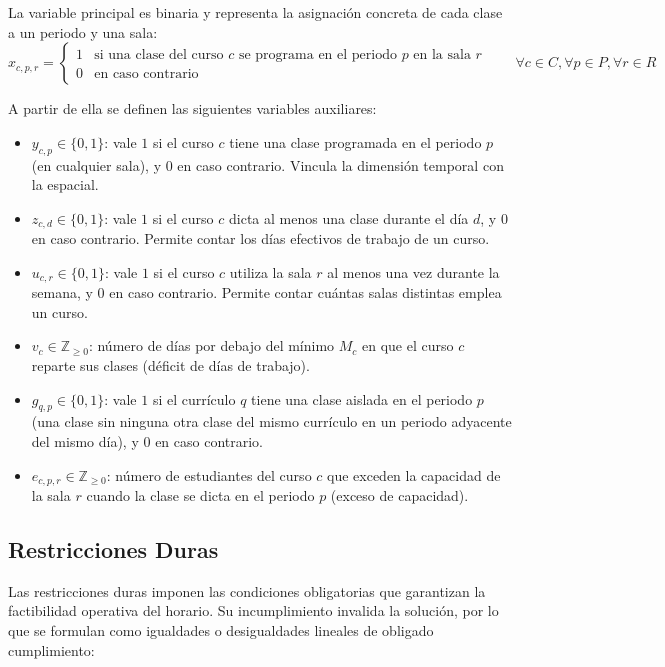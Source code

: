 \documentclass[letter, 10pt]{article}
\begin{document}
La variable principal es binaria y representa la asignación concreta de cada clase a un periodo y una sala:
\begin{equation}
x_{c,p,r} = 
\begin{cases} 
1 & \text{si una clase del curso } c \text{ se programa en el periodo } p \text{ en la sala } r \\
0 & \text{en caso contrario}
\end{cases}
\qquad \forall c \in C, \forall p \in P, \forall r \in R
\end{equation}

A partir de ella se definen las siguientes variables auxiliares:
\begin{itemize}
    \item $y_{c,p} \in \{0,1\}$: vale $1$ si el curso $c$ tiene una clase programada en el periodo $p$ (en cualquier sala), y $0$ en caso contrario. Vincula la dimensión temporal con la espacial.
    \item $z_{c,d} \in \{0,1\}$: vale $1$ si el curso $c$ dicta al menos una clase durante el día $d$, y $0$ en caso contrario. Permite contar los días efectivos de trabajo de un curso.
    \item $u_{c,r} \in \{0,1\}$: vale $1$ si el curso $c$ utiliza la sala $r$ al menos una vez durante la semana, y $0$ en caso contrario. Permite contar cuántas salas distintas emplea un curso.
    \item $v_c \in \mathbb{Z}_{\geq 0}$: número de días por debajo del mínimo $M_c$ en que el curso $c$ reparte sus clases (déficit de días de trabajo).
    \item $g_{q,p} \in \{0,1\}$: vale $1$ si el currículo $q$ tiene una clase aislada en el periodo $p$ (una clase sin ninguna otra clase del mismo currículo en un periodo adyacente del mismo día), y $0$ en caso contrario.
    \item $e_{c,p,r} \in \mathbb{Z}_{\geq 0}$: número de estudiantes del curso $c$ que exceden la capacidad de la sala $r$ cuando la clase se dicta en el periodo $p$ (exceso de capacidad).
\end{itemize}

\subsection{Restricciones Duras}
Las restricciones duras imponen las condiciones obligatorias que garantizan la factibilidad operativa del horario. Su incumplimiento invalida la solución, por lo que se formulan como igualdades o desigualdades lineales de obligado cumplimiento:
\end{document}
